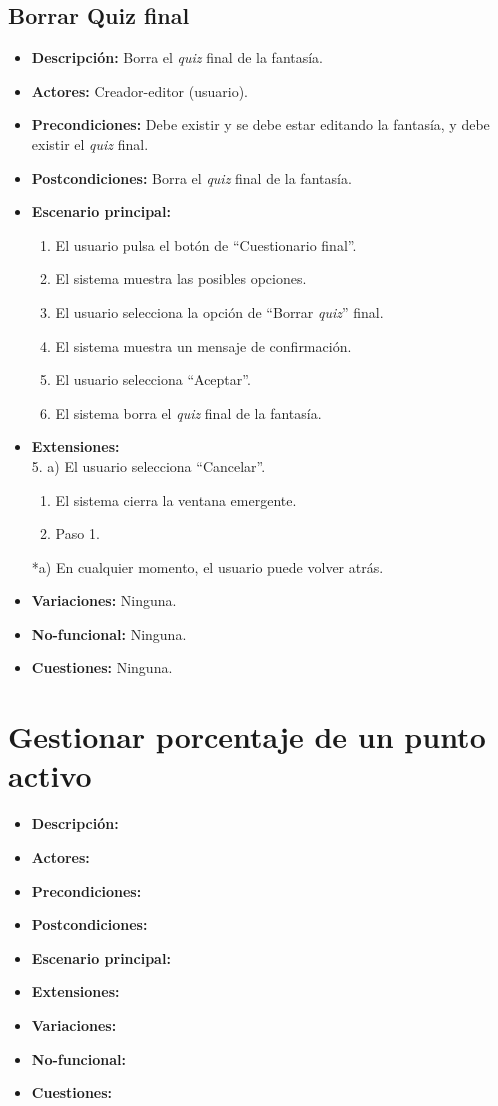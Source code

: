\documentclass[12pt,letterpaper]{article}
\begin{document}
\subsection{Borrar Quiz final}
\begin{itemize}
	\item \textbf{Descripción:} Borra el \textit{quiz} final de la fantasía.
	\item \textbf{Actores:} Creador-editor (usuario).
	\item \textbf{Precondiciones:} Debe existir y se debe estar editando la fantasía, y debe existir el \textit{quiz} final.
	\item \textbf{Postcondiciones:} Borra el \textit{quiz} final de la fantasía.
	\item \textbf{Escenario principal:}
	\begin{enumerate}
		\item El usuario pulsa el botón de ``Cuestionario final''.
		\item El sistema muestra las posibles opciones.
		\item El usuario selecciona la opción de ``Borrar \textit{quiz}'' final.
		\item El sistema muestra un mensaje de confirmación.
		\item El usuario selecciona ``Aceptar''.
		\item El sistema borra el \textit{quiz} final de la fantasía.
	\end{enumerate}
	\item \textbf{Extensiones:} \\ 5. a) El usuario selecciona ``Cancelar''.
	\begin{enumerate}
		\item El sistema cierra la ventana emergente.
		\item Paso 1.
	\end{enumerate}
	*a) En cualquier momento, el usuario puede volver atrás.
	\item \textbf{Variaciones:} Ninguna.
	\item \textbf{No-funcional:} Ninguna.
	\item \textbf{Cuestiones:} Ninguna.
\end{itemize}


\section{Gestionar porcentaje de un punto activo}
\begin{itemize}
	\item \textbf{Descripción:}
	\item \textbf{Actores:}
	\item \textbf{Precondiciones:}
	\item \textbf{Postcondiciones:}
	\item \textbf{Escenario principal:}
	\item \textbf{Extensiones:}
	\item \textbf{Variaciones:}
	\item \textbf{No-funcional:}
	\item \textbf{Cuestiones:}
\end{itemize}
\end{document}
